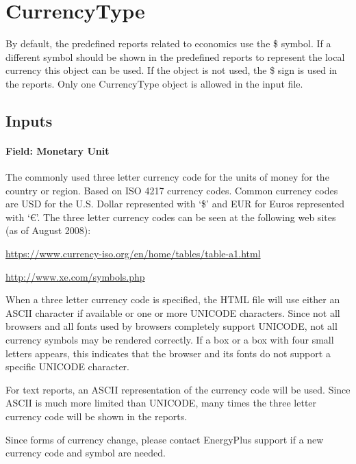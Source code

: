 \section{CurrencyType}\label{currencytype}
By default, the predefined reports related to economics use the \$ symbol. If a different symbol should be shown in the predefined reports to represent the local currency this object can be used. If the object is not used, the \$ sign is used in the reports. Only one CurrencyType object is allowed in the input file.

\subsection{Inputs}\label{inputs-061}

\paragraph{Field: Monetary Unit}\label{field-monetary-unit}

The commonly used three letter currency code for the units of money for the country or region. Based on ISO 4217 currency codes. Common currency codes are USD for the U.S. Dollar represented with `\$' and EUR for Euros represented with `€'. The three letter currency codes can be seen at the following web sites (as of August 2008):

\url{https://www.currency-iso.org/en/home/tables/table-a1.html}

\url{http://www.xe.com/symbols.php}

When a three letter currency code is specified, the HTML file will use either an ASCII character if available or one or more UNICODE characters. Since not all browsers and all fonts used by browsers completely support UNICODE, not all currency symbols may be rendered correctly. If a box or a box with four small letters appears, this indicates that the browser and its fonts do not support a specific UNICODE character.

For text reports, an ASCII representation of the currency code will be used. Since ASCII is much more limited than UNICODE, many times the three letter currency code will be shown in the reports.

Since forms of currency change, please contact EnergyPlus support if a new currency code and symbol are needed.
